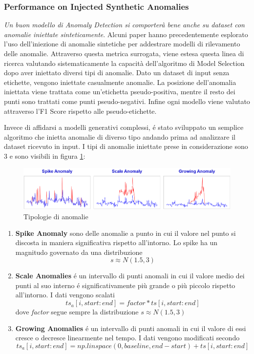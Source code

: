 \subsubsection{Performance on Injected Synthetic Anomalies}
\textit{Un buon modello di Anomaly Detection si comporterà bene anche su dataset con anomalie iniettate sinteticamente}. Alcuni paper hanno precedentemente esplorato l'uso dell'iniezione di anomalie sintetiche per addestrare modelli di rilevamento delle anomalie. Attraverso questa metrica surrogata, viene estesa questa linea di ricerca valutando sistematicamente la capacità dell'algoritmo di Model Selection dopo aver iniettato diversi tipi di anomalie. Dato un dataset di input senza etichette, vengono iniettate casualmente anomalie. La posizione dell'anomalia iniettata viene trattata come un'etichetta pseudo-positiva, mentre il resto dei punti sono trattati come punti pseudo-negativi. 
Infine ogni modello viene valutato attraverso l'F1 Score rispetto alle pseudo-etichette.

Invece di affidarsi a modelli generativi complessi, é stato sviluppato un semplice algoritmo che inietta anomalie di diverso tipo andando prima ad analizzare il dataset ricevuto in input. I tipi di anomalie iniettate prese in considerazione sono 3 e sono visibili in figura \ref{tipi-anomalie}: 
\begin{figure}[t]
	\centering
	\includegraphics[width=14cm, scale=1]{images/anomalies}
	\caption{Tipologie di anomalie}
	\label{tipi-anomalie}
		
\end{figure}


\begin{enumerate}
	\item \textbf{Spike Anomaly} sono delle anomalie a punto in cui il valore nel punto si discosta in maniera significativa rispetto all'intorno. Lo spike ha un magnitudo governato da una distribuzione \[s \approx N(1.5, 3) \]
	\item \textbf{Scale Anomalies} é un intervallo di punti anomali in cui il  valore medio dei punti al suo interno é significativamente più grande o più piccolo rispetto all'intorno. I dati vengono scalati \[ ts_a[i, start:end] = factor*ts[i, start:end]\] dove \textit{factor} segue sempre la distribuzione \(s \approx N(1.5, 3) \)
	\item \textbf{Growing Anomalies} é un intervallo di punti anomali in cui il valore di essi cresce o decresce linearmente nel tempo. I dati vengono modificati secondo \[ ts_a[i, start:end] = np.linspace(0, baseline, end-start) + ts[i, start:end] \] 
\end{enumerate}

